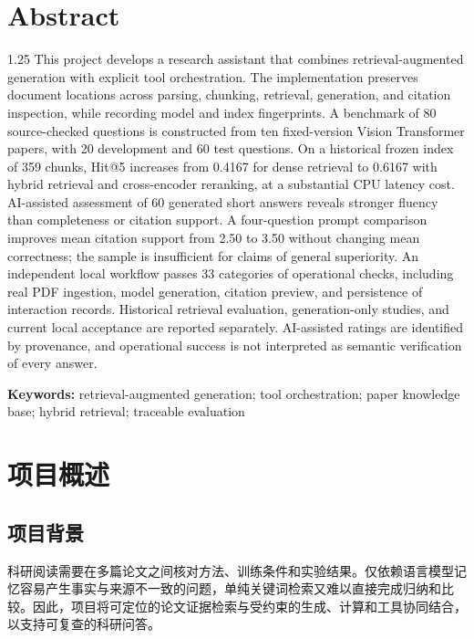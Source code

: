 \documentclass[UTF8,a4paper,zihao=-4,fontset=fandol]{ctexart}
\begin{document}
\section*{Abstract}
\begin{spacing}{1.25}\small
This project develops a research assistant that combines retrieval-augmented generation with explicit tool orchestration.
The implementation preserves document locations across parsing, chunking, retrieval, generation, and citation inspection, while recording model and index fingerprints.
A benchmark of 80 source-checked questions is constructed from ten fixed-version Vision Transformer papers, with 20 development and 60 test questions.
On a historical frozen index of 359 chunks, Hit@5 increases from 0.4167 for dense retrieval to 0.6167 with hybrid retrieval and cross-encoder reranking, at a substantial CPU latency cost.
AI-assisted assessment of 60 generated short answers reveals stronger fluency than completeness or citation support.
A four-question prompt comparison improves mean citation support from 2.50 to 3.50 without changing mean correctness; the sample is insufficient for claims of general superiority.
An independent local workflow passes 33 categories of operational checks, including real PDF ingestion, model generation, citation preview, and persistence of interaction records.
Historical retrieval evaluation, generation-only studies, and current local acceptance are reported separately.
AI-assisted ratings are identified by provenance, and operational success is not interpreted as semantic verification of every answer.
\par\noindent\textbf{Keywords:} retrieval-augmented generation; tool orchestration; paper knowledge base; hybrid retrieval; traceable evaluation
\end{spacing}
\clearpage\tableofcontents\clearpage
{}

\section{项目概述}
\subsection{项目背景}
科研阅读需要在多篇论文之间核对方法、训练条件和实验结果。仅依赖语言模型记忆容易产生事实与来源不一致的问题，单纯关键词检索又难以直接完成归纳和比较。因此，项目将可定位的论文证据检索与受约束的生成、计算和工具协同结合，以支持可复查的科研问答。
\end{document}
